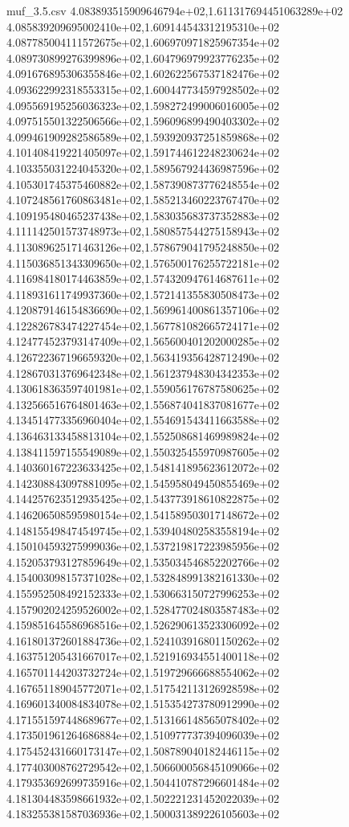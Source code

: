 \begin{filecontents*}{muf_3.5.csv}
4.083893515909646794e+02,1.611317694451063289e+02
4.085839209695002410e+02,1.609144543312195310e+02
4.087785004111572675e+02,1.606970971825967354e+02
4.089730899276399896e+02,1.604796979923776235e+02
4.091676895306355846e+02,1.602622567537182476e+02
4.093622992318553315e+02,1.600447734597928502e+02
4.095569195256036323e+02,1.598272499006016005e+02
4.097515501322506566e+02,1.596096899490403302e+02
4.099461909282586589e+02,1.593920937251859868e+02
4.101408419221405097e+02,1.591744612248230624e+02
4.103355031224045320e+02,1.589567924436987596e+02
4.105301745375460882e+02,1.587390873776248554e+02
4.107248561760863481e+02,1.585213460223767470e+02
4.109195480465237438e+02,1.583035683737352883e+02
4.111142501573748973e+02,1.580857544275158943e+02
4.113089625171463126e+02,1.578679041795248850e+02
4.115036851343309650e+02,1.576500176255722181e+02
4.116984180174463859e+02,1.574320947614687611e+02
4.118931611749937360e+02,1.572141355830508473e+02
4.120879146154836690e+02,1.569961400861357106e+02
4.122826783474227454e+02,1.567781082665724171e+02
4.124774523793147409e+02,1.565600401202000285e+02
4.126722367196659320e+02,1.563419356428712490e+02
4.128670313769642348e+02,1.561237948304342353e+02
4.130618363597401981e+02,1.559056176787580625e+02
4.132566516764801463e+02,1.556874041837081677e+02
4.134514773356960404e+02,1.554691543411663588e+02
4.136463133458813104e+02,1.552508681469989824e+02
4.138411597155549089e+02,1.550325455970987605e+02
4.140360167223633425e+02,1.548141895623612072e+02
4.142308843097881095e+02,1.545958049450855469e+02
4.144257623512935425e+02,1.543773918610822875e+02
4.146206508595980154e+02,1.541589503017148672e+02
4.148155498474549745e+02,1.539404802583558194e+02
4.150104593275999036e+02,1.537219817223985956e+02
4.152053793127859649e+02,1.535034546852202766e+02
4.154003098157371028e+02,1.532848991382161330e+02
4.155952508492152333e+02,1.530663150727996253e+02
4.157902024259526002e+02,1.528477024803587483e+02
4.159851645586968516e+02,1.526290613523306092e+02
4.161801372601884736e+02,1.524103916801150262e+02
4.163751205431667017e+02,1.521916934551400118e+02
4.165701144203732724e+02,1.519729666688554062e+02
4.167651189045772071e+02,1.517542113126928598e+02
4.169601340084834078e+02,1.515354273780912990e+02
4.171551597448689677e+02,1.513166148565078402e+02
4.173501961264686884e+02,1.510977737394096039e+02
4.175452431660173147e+02,1.508789040182446115e+02
4.177403008762729542e+02,1.506600056845109066e+02
4.179353692699735916e+02,1.504410787296601484e+02
4.181304483598661932e+02,1.502221231452022039e+02
4.183255381587036936e+02,1.500031389226105603e+02

\end{filecontents*}

